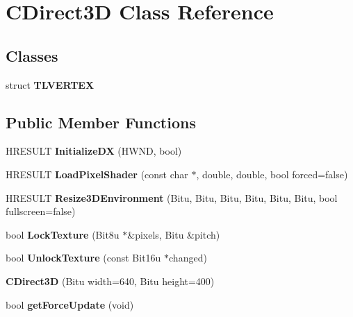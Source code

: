\hypertarget{classCDirect3D}{\section{C\-Direct3\-D Class Reference}
\label{classCDirect3D}
}
\subsection*{Classes}
\begin{DoxyCompactItemize}
\item 
struct {\bfseries T\-L\-V\-E\-R\-T\-E\-X}
\end{DoxyCompactItemize}
\subsection*{Public Member Functions}
\begin{DoxyCompactItemize}
\item 
\hypertarget{classCDirect3D_af7252e1b4e62fad15bd0737efaf1020b}{H\-R\-E\-S\-U\-L\-T {\bfseries Initialize\-D\-X} (H\-W\-N\-D, bool)}\label{classCDirect3D_af7252e1b4e62fad15bd0737efaf1020b}

\item 
\hypertarget{classCDirect3D_aa150a4206bea62e1db00c9a578db92d2}{H\-R\-E\-S\-U\-L\-T {\bfseries Load\-Pixel\-Shader} (const char $\ast$, double, double, bool forced=false)}\label{classCDirect3D_aa150a4206bea62e1db00c9a578db92d2}

\item 
\hypertarget{classCDirect3D_ae478c1f051dac2d351bd1248ad9e7b6e}{H\-R\-E\-S\-U\-L\-T {\bfseries Resize3\-D\-Environment} (Bitu, Bitu, Bitu, Bitu, Bitu, Bitu, bool fullscreen=false)}\label{classCDirect3D_ae478c1f051dac2d351bd1248ad9e7b6e}

\item 
\hypertarget{classCDirect3D_a812efd841357b6eb503d4a98b59dc312}{bool {\bfseries Lock\-Texture} (Bit8u $\ast$\&pixels, Bitu \&pitch)}\label{classCDirect3D_a812efd841357b6eb503d4a98b59dc312}

\item 
\hypertarget{classCDirect3D_aa96cedde54fddd444ddcc594dc5bfb7c}{bool {\bfseries Unlock\-Texture} (const Bit16u $\ast$changed)}\label{classCDirect3D_aa96cedde54fddd444ddcc594dc5bfb7c}

\item 
\hypertarget{classCDirect3D_acf967be6a39166348509f49ef0773747}{{\bfseries C\-Direct3\-D} (Bitu width=640, Bitu height=400)}\label{classCDirect3D_acf967be6a39166348509f49ef0773747}

\item 
\hypertarget{classCDirect3D_aca465f14d712de242b06a743a7cdc37b}{bool {\bfseries get\-Force\-Update} (void)}\label{classCDirect3D_aca465f14d712de242b06a743a7cdc37b}

\end{DoxyCompactItemize}
